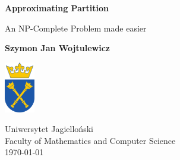 \begin{titlepage}
    \begin{center}
        \vspace*{1cm}
        
        \Huge
        \textbf{Approximating Partition}
        
        \vspace{0.5cm}
        \LARGE
        An NP-Complete Problem made easier
        
        \vspace{1.5cm}
        
        \small
        \textbf{Szymon Jan Wojtulewicz}
        
        \vfill
        
        
        
        \includegraphics[width=0.1\textwidth]{university_logo.png}
        
        \vspace{0.8cm}
        \Large
        Uniwersytet Jagielloński\\
        Faculty of Mathematics and Computer Science\\
        \today
        
    \end{center}
\end{titlepage}
